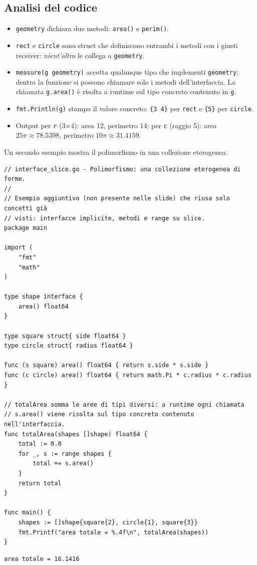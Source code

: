 \documentclass[11pt,a4paper]{report}
\newcommand{\cod}[1]{\texttt{#1}}
\begin{document}
\subsection{Analisi del codice}

\begin{itemize}
  \item \cod{geometry} dichiara due metodi: \cod{area()} e \cod{perim()}.
  \item \cod{rect} e \cod{circle} sono struct che definiscono entrambi i
        metodi con i giusti receiver: \emph{nient'altro} le collega a
        \cod{geometry}.
  \item \cod{measure(g geometry)} accetta qualunque tipo che implementi
        \cod{geometry}; dentro la funzione si possono chiamare solo i metodi
        dell'interfaccia. La chiamata \cod{g.area()} è risolta a runtime sul tipo
        concreto contenuto in \cod{g}.
  \item \cod{fmt.Println(g)} stampa il valore concreto: \cod{\{3 4\}} per
        \cod{rect} e \cod{\{5\}} per \cod{circle}.
  \item Output per \cod{r} (3$\times$4): area 12, perimetro 14; per \cod{c}
        (raggio 5): area $25\pi\approx78.5398$, perimetro $10\pi\approx31.4159$.
\end{itemize}

Un secondo esempio mostra il polimorfismo in una collezione eterogenea:

\begin{lstlisting}[style=gocode,caption={\texttt{05\_methods\_interfaces/interface\_slice.go}}]
// interface_slice.go - Polimorfismo: una collezione eterogenea di forme.
//
// Esempio aggiuntivo (non presente nelle slide) che riusa solo concetti già
// visti: interfacce implicite, metodi e range su slice.
package main

import (
	"fmt"
	"math"
)

type shape interface {
	area() float64
}

type square struct{ side float64 }
type circle struct{ radius float64 }

func (s square) area() float64 { return s.side * s.side }
func (c circle) area() float64 { return math.Pi * c.radius * c.radius }

// totalArea somma le aree di tipi diversi: a runtime ogni chiamata
// s.area() viene risolta sul tipo concreto contenuto nell'interfaccia.
func totalArea(shapes []shape) float64 {
	total := 0.0
	for _, s := range shapes {
		total += s.area()
	}
	return total
}

func main() {
	shapes := []shape{square{2}, circle{1}, square{3}}
	fmt.Printf("area totale = %.4f\n", totalArea(shapes))
}
\end{lstlisting}
\begin{lstlisting}[style=output]
area totale = 16.1416
\end{lstlisting}
\end{document}
